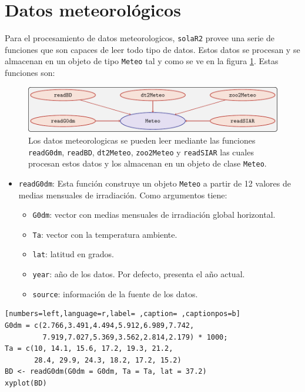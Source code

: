 \section{Datos meteorológicos}
\label{sec:org564d59c}
\label{sec:datos-meteorologicos}
Para el procesamiento de datos meteorologicos, \texttt{solaR2} provee una serie de funciones que son capaces de leer todo tipo de datos. Estos datos se procesan y se almacenan en un objeto de tipo \texttt{Meteo} tal y como se ve en la figura \ref{fig:meteo}. Estas funciones son:
\begin{figure}[!htb]
\centering
\includegraphics[keepaspectratio,width=\textwidth,height=0.8\textheight]{figuras/meteo.pdf}
\caption{Los datos meteorologicas se pueden leer mediante las funciones \texttt{readG0dm}, \texttt{readBD}, \texttt{dt2Meteo}, \texttt{zoo2Meteo} y \texttt{readSIAR} las cuales procesan estos datos y los almacenan en un objeto de clase \texttt{Meteo}. \label{fig:meteo}}
\end{figure}
\begin{itemize}
\item \texttt{readG0dm}: Esta función construye un objeto \texttt{Meteo} a partir de 12 valores de medias mensuales de irradiación.
Como argumentos tiene:
\begin{itemize}
\item \texttt{G0dm}: vector con medias mensuales de irradiación global horizontal.
\item \texttt{Ta}: vector con la temperatura ambiente.
\item \texttt{lat}: latitud en grados.
\item \texttt{year}: año de los datos. Por defecto, presenta el año actual.
\item \texttt{source}: información de la fuente de los datos.
\end{itemize}
\end{itemize}
\begin{lstlisting}[numbers=left,language=r,label= ,caption= ,captionpos=b]
G0dm = c(2.766,3.491,4.494,5.912,6.989,7.742,
         7.919,7.027,5.369,3.562,2.814,2.179) * 1000;
Ta = c(10, 14.1, 15.6, 17.2, 19.3, 21.2,
       28.4, 29.9, 24.3, 18.2, 17.2, 15.2)
BD <- readG0dm(G0dm = G0dm, Ta = Ta, lat = 37.2)
xyplot(BD)
\end{lstlisting}

